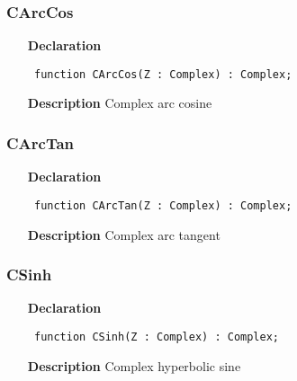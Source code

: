 \documentclass[12pt,a4paper,oneside]{report}
\newcommand{\declarationitem}[1]{\textbf{#1}}
\newcommand{\descriptiontitle}[1]{\textbf{#1}}
\newcommand{\code}[1]{\texttt{#1}}
\begin{document}
\subsubsection{CArcCos}
\label{ucomplex-CArcCos}
\begin{itemize}\item[\declarationitem{Declaration}\hfill]
\begin{flushleft}
\code{
function CArcCos(Z : Complex) : Complex;}

\end{flushleft}

\par
\item[\descriptiontitle{Description}]
Complex arc cosine

\end{itemize}
\subsubsection{CArcTan}
\label{ucomplex-CArcTan}
\begin{itemize}\item[\declarationitem{Declaration}\hfill]
\begin{flushleft}
\code{
function CArcTan(Z : Complex) : Complex;}

\end{flushleft}

\par
\item[\descriptiontitle{Description}]
Complex arc tangent

\end{itemize}
\subsubsection{CSinh}
\label{ucomplex-CSinh}
\begin{itemize}\item[\declarationitem{Declaration}\hfill]
\begin{flushleft}
\code{
function CSinh(Z : Complex) : Complex;}

\end{flushleft}

\par
\item[\descriptiontitle{Description}]
Complex hyperbolic sine

\end{itemize}
\end{document}
